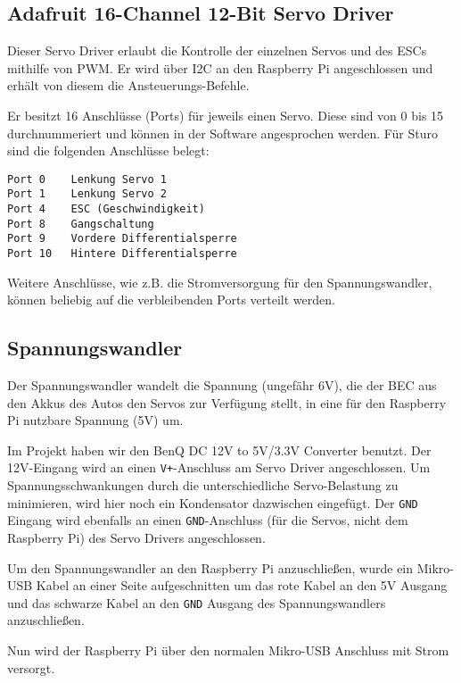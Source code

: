 \documentclass[a4paper,10pt]{scrartcl}
\begin{document}
  \subsection{Adafruit 16-Channel 12-Bit Servo Driver}

    Dieser Servo Driver \cite{adafruitmod} erlaubt die Kontrolle der einzelnen
    Servos und des ESCs mithilfe von PWM.
    Er wird über I2C an den Raspberry Pi angeschlossen und erhält von diesem die
    Ansteuerungs-Befehle.

    Er besitzt 16 Anschlüsse (Ports) für jeweils einen Servo.
    Diese sind von 0 bis 15 durchnummeriert und können in der Software
    angesprochen werden.
    Für Sturo sind die folgenden Anschlüsse belegt:

    \begin{lstlisting}
Port 0    Lenkung Servo 1
Port 1    Lenkung Servo 2
Port 4    ESC (Geschwindigkeit)
Port 8    Gangschaltung
Port 9    Vordere Differentialsperre
Port 10   Hintere Differentialsperre
    \end{lstlisting}

    Weitere Anschlüsse, wie z.B. die Stromversorgung für den Spannungswandler,
    können beliebig auf die verbleibenden Ports verteilt werden.

  \subsection{Spannungswandler}

    Der Spannungswandler wandelt die Spannung (ungefähr 6V), die der BEC aus den
    Akkus des Autos den Servos zur Verfügung stellt, in eine für den
    Raspberry Pi nutzbare Spannung (5V) um.

    Im Projekt haben wir den BenQ DC 12V to 5V/3.3V Converter benutzt.
    Der 12V-Eingang wird an einen \lstinline{V+}-Anschluss am Servo Driver
    angeschlossen.
    Um Spannungsschwankungen durch die unterschiedliche Servo-Belastung zu
    minimieren, wird hier noch ein Kondensator dazwischen eingefügt.
    Der \lstinline{GND} Eingang wird ebenfalls an einen
    \lstinline{GND}-Anschluss (für die Servos, nicht dem Raspberry Pi) des Servo
    Drivers angeschlossen.

    Um den Spannungswandler an den Raspberry Pi anzuschließen, wurde ein
    Mikro-USB Kabel an einer Seite aufgeschnitten um das rote Kabel an den 5V
    Ausgang und das schwarze Kabel an den \lstinline{GND} Ausgang des
    Spannungswandlers anzuschließen.

    Nun wird der Raspberry Pi über den normalen Mikro-USB Anschluss mit Strom
    versorgt.
\end{document}
